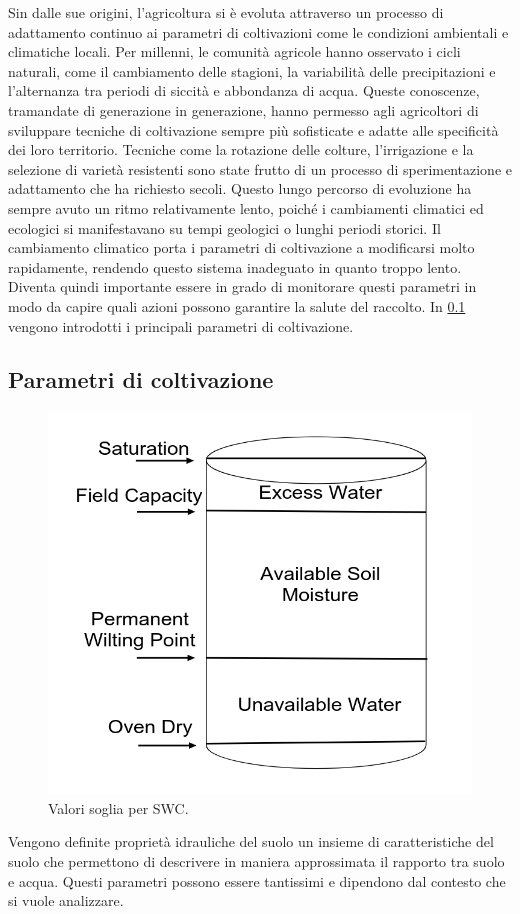 \documentclass[12pt,a4paper,openright,twoside, openany]{book}
\begin{document}
Sin dalle sue origini, l'agricoltura si è evoluta attraverso un processo di adattamento continuo ai parametri di coltivazioni come le condizioni ambientali e climatiche locali. Per millenni, le comunità agricole hanno osservato i cicli naturali, come il cambiamento delle stagioni, la variabilità delle precipitazioni e l'alternanza tra periodi di siccità e abbondanza di acqua. Queste conoscenze, tramandate di generazione in generazione, hanno permesso agli agricoltori di sviluppare tecniche di coltivazione sempre più sofisticate e adatte alle specificità dei loro territorio. Tecniche come la rotazione delle colture, l'irrigazione e la selezione di varietà resistenti sono state frutto di un processo di sperimentazione e adattamento che ha richiesto secoli.
Questo lungo percorso di evoluzione ha sempre avuto un ritmo relativamente lento, poiché i cambiamenti climatici ed ecologici si manifestavano su tempi geologici o lunghi periodi storici\cite{Janani2024}.
Il cambiamento climatico porta i parametri di coltivazione a modificarsi molto rapidamente, rendendo questo sistema inadeguato in quanto troppo lento. Diventa quindi importante essere in grado di monitorare questi parametri in modo da capire quali azioni possono garantire la salute del raccolto\cite{Monteleone2023}. In \cref{parametri-coltivazione} vengono introdotti i principali parametri di coltivazione.
\newpage
\subsection{Parametri di coltivazione}\label{parametri-coltivazione}

\begin{figure}
    \centering
    \includegraphics[width=0.4\linewidth]{../figures/SWC-costants.png}
    \caption{Valori soglia per SWC\cite{Ding2022}.}
    \label{fig.SWC-costants}
\end{figure}

Vengono definite proprietà idrauliche del suolo un insieme di caratteristiche del suolo che permettono di descrivere in maniera approssimata il rapporto tra suolo e acqua. Questi parametri possono essere tantissimi e dipendono dal contesto che si vuole analizzare.
\end{document}
